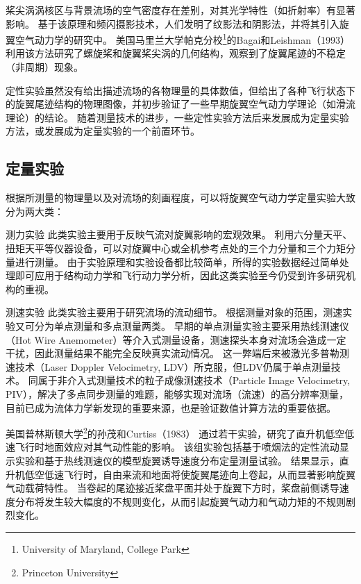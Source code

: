 \documentclass[doctor,openright,twoside,color]{buaathesis}
\begin{document}
桨尖涡涡核区与背景流场的空气密度存在差别，对其光学特性（如折射率）有显著影响。
基于该原理和频闪摄影技术，人们发明了纹影法和阴影法，并将其引入旋翼空气动力学的研究中。
美国马里兰大学帕克分校\footnote{University of Maryland, College Park}的Bagai和Leishman（1993）
利用该方法研究了螺旋桨和旋翼桨尖涡的几何结构，观察到了旋翼尾迹的不稳定（非周期）现象。

定性实验虽然没有给出描述流场的各物理量的具体数值，但给出了各种飞行状态下的旋翼尾迹结构的物理图像，并初步验证了一些早期旋翼空气动力学理论（如滑流理论）的结论。
随着测量技术的进步，一些定性实验方法后来发展成为定量实验方法，或发展成为定量实验的一个前置环节。

\subsection{定量实验}
根据所测量的物理量以及对流场的刻画程度，可以将旋翼空气动力学定量实验大致分为两大类：
\begin{compactdesc}
  \item[测力实验]
  此类实验主要用于反映气流对旋翼影响的宏观效果。
  利用六分量天平、扭矩天平等仪器设备，可以对旋翼中心或全机参考点处的三个力分量和三个力矩分量进行测量。
  由于实验原理和实验设备都比较简单，所得的实验数据经过简单处理即可应用于结构动力学和飞行动力学分析，因此这类实验至今仍受到许多研究机构的重视。
  \item[测速实验]
  此类实验主要用于研究流场的流动细节。
  根据测量对象的范围，测速实验又可分为单点测量和多点测量两类。
  早期的单点测量实验主要采用热线测速仪（Hot Wire Anemometer）等介入式测量设备，测速探头本身对流场会造成一定干扰，因此测量结果不能完全反映真实流动情况。
  这一弊端后来被激光多普勒测速技术（Laser Doppler Velocimetry, LDV）所克服，但LDV仍属于单点测量技术。
  同属于非介入式测量技术的粒子成像测速技术（Particle Image Velocimetry, PIV），解决了多点同步测量的难题，能够实现对流场（流速）的高分辨率测量，
  目前已成为流体力学新发现的重要来源，也是验证数值计算方法的重要依据。
\end{compactdesc}

美国普林斯顿大学\footnote{Princeton University}的孙茂和Curtiss（1983）
通过若干实验，研究了直升机低空低速飞行时地面效应对其气动性能的影响。
该组实验包括基于喷烟法的定性流动显示实验和基于热线测速仪的模型旋翼诱导速度分布定量测量试验。
结果显示，直升机低空低速飞行时，自由来流和地面将使旋翼尾迹向上卷起，从而显著影响旋翼气动载荷特性。
当卷起的尾迹接近桨盘平面并处于旋翼下方时，桨盘前侧诱导速度分布将发生较大幅度的不规则变化，从而引起旋翼气动力和气动力矩的不规则剧烈变化。
\end{document}
